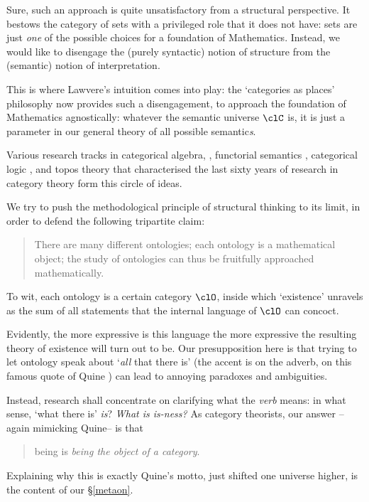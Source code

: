 Sure, such an approach is quite unsatisfactory from a structural perspective. It bestows the category of sets with a privileged role that it does not have: sets are just \emph{one} of the possible choices for a foundation of Mathematics. Instead, we would like to disengage the (purely syntactic) notion of structure from the (semantic) notion of interpretation.

This is where Lawvere's intuition comes into play: the `categories as places' philosophy now provides such a disengagement, to approach the foundation of Mathematics agnostically: whatever the semantic universe $\clC$ is, it is just a parameter in our general theory of all possible semantic\emph{s}.

Various research tracks in categorical algebra, \cite{Janelidze2004}, functorial semantics \cite{lawvere1963functorial,hyland2007category}, categorical logic \cite{lambek1988introduction}, and topos theory \cite{JohnstonePT} that characterised the last sixty years of research in category theory form this circle of ideas.

We try to push the methodological principle of structural thinking to its limit, in order to defend the following tripartite claim: 
\begin{quote}
  There are many different ontologies; each ontology is a mathematical object; the study of ontologies can thus be fruitfully approached mathematically.
\end{quote}
To wit, each ontology is a certain category $\clO$, inside which `existence' unravels as the sum of all statements that the internal language of $\clO$ can concoct.

Evidently, the more expressive is this language the more expressive the resulting theory of existence will turn out to be. Our presupposition here is that trying to let ontology speak about `\emph{all} that there is' (the accent is on the adverb, on this famous quote of Quine \cite{quine1948there}) can lead to annoying paradoxes and ambiguities. 

Instead, research shall concentrate on clarifying what the \emph{verb} means: in what sense, `what there is' \emph{is}? \emph{What is is-ness?} As category theorists, our answer --again mimicking Quine-- is that
\begin{quote}
	being is \emph{being the object of a category}.
\end{quote}
Explaining why this is exactly Quine's motto, just shifted one universe higher, is the content of our §\ref{metaon}.
